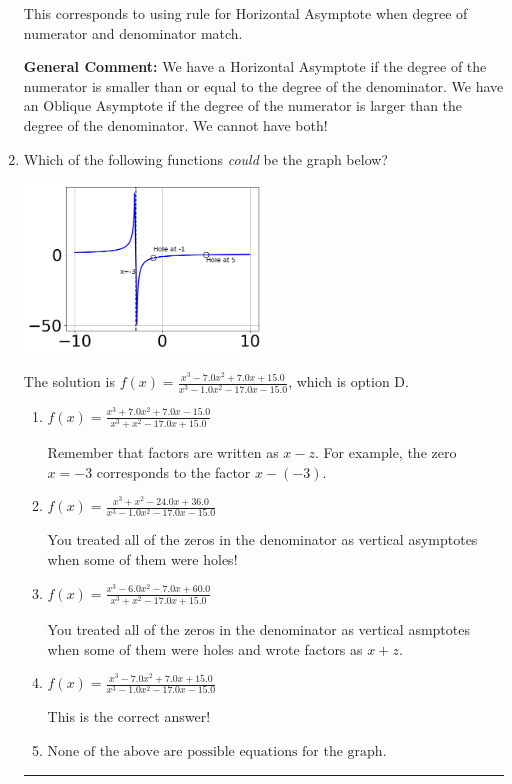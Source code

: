 \documentclass{extbook}[14pt]
\newcommand{\litem}[1]{\item #1

\rule{\textwidth}{0.4pt}}
\begin{document}
\begin{enumerate}
{\begin{enumerate}[label=\Alph*.]
This corresponds to using rule for Horizontal Asymptote when degree of numerator and denominator match.
\end{enumerate}

\textbf{General Comment:} We have a Horizontal Asymptote if the degree of the numerator is smaller than or equal to the degree of the denominator. We have an Oblique Asymptote if the degree of the numerator is larger than the degree of the denominator. We cannot have both!
}
\litem{
Which of the following functions \textit{could} be the graph below?

\begin{center}
    \includegraphics[width=0.5\textwidth]{../Figures/identifyGraphOfRationalFunctionB.png}
\end{center}


The solution is \( f(x)=\frac{x^{3} -7.0 x^{2} +7.0 x + 15.0}{x^{3} -1.0 x^{2} -17.0 x -15.0} \), which is option D.\begin{enumerate}[label=\Alph*.]
\item \( f(x)=\frac{x^{3} +7.0 x^{2} +7.0 x -15.0}{x^{3} + x^{2} -17.0 x + 15.0} \)

Remember that factors are written as $x-z$. For example, the zero $x=-3$ corresponds to the factor $x-(-3)$.
\item \( f(x)=\frac{x^{3} + x^{2} -24.0 x + 36.0}{x^{3} -1.0 x^{2} -17.0 x -15.0} \)

You treated all of the zeros in the denominator as vertical asymptotes when some of them were holes!
\item \( f(x)=\frac{x^{3} -6.0 x^{2} -7.0 x + 60.0}{x^{3} + x^{2} -17.0 x + 15.0} \)

You treated all of the zeros in the denominator as vertical asmptotes when some of them were holes and wrote factors as $x+z$.
\item \( f(x)=\frac{x^{3} -7.0 x^{2} +7.0 x + 15.0}{x^{3} -1.0 x^{2} -17.0 x -15.0} \)

This is the correct answer!
\item \( \text{None of the above are possible equations for the graph.} \)


\end{enumerate}}
\end{enumerate}
\end{document}
